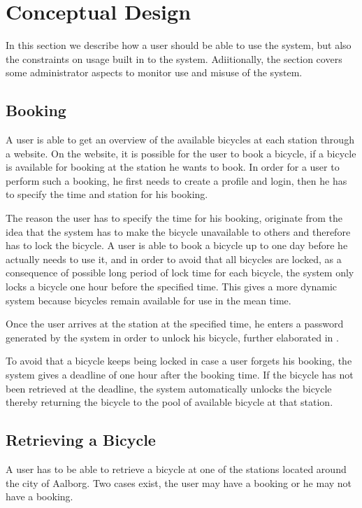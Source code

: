 \section{Conceptual Design}
In this section we describe how a user should be able to use the system, but also the constraints on usage built in to the system.
Adiitionally, the section covers some administrator aspects to monitor use and misuse of the system.

\subsection{Booking}
A user is able to get an overview of the available bicycles at each station through a website. 
On the website, it is possible for the user to book a bicycle, if a bicycle is available for booking at the station he wants to book. 
In order for a user to perform such a booking, he first needs to create a profile and login, then he has to specify the time and station for his booking.

The reason the user has to specify the time for his booking, originate from the idea that the system has to make the bicycle unavailable to others and therefore has to lock the bicycle.
A user is able to book a bicycle up to one day before he actually needs to use it, and in order to avoid that all bicycles are locked, as a consequence of possible long period of lock time for each bicycle, the system only locks a bicycle one hour before the specified time.
This gives a more dynamic system because bicycles remain available for use in the mean time.

Once the user arrives at the station at the specified time, he enters a password generated by the system in order to unlock his bicycle, further elaborated in .

To avoid that a bicycle keeps being locked in case a user forgets his booking, the system gives a deadline of one hour after the booking time.
If the bicycle has not been retrieved at the deadline, the system automatically unlocks the bicycle thereby returning the bicycle to the pool of available bicycle at that station. 

\subsection{Retrieving a Bicycle}\label{sec:conceptretrieveandshit}
A user has to be able to retrieve a bicycle at one of the stations located around the city of Aalborg.
Two cases exist, the user may have a booking or he may not have a booking.

